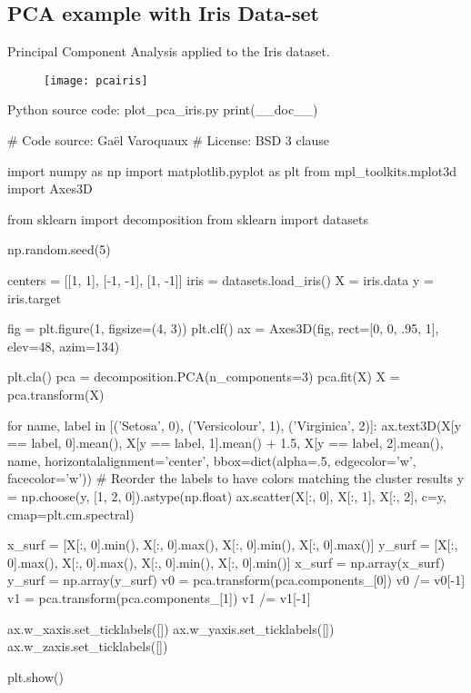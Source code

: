 \subsection*{PCA example with Iris Data-set}
Principal Component Analysis applied to the Iris dataset.
\begin{figure}
\centering
\texttt{[image: pcairis]}
\caption{}
\label{fig:pcairis}
\end{figure}

Python source code: plot_pca_iris.py
print(__doc__)


# Code source: Gaël Varoquaux
# License: BSD 3 clause

import numpy as np
import matplotlib.pyplot as plt
from mpl_toolkits.mplot3d import Axes3D


from sklearn import decomposition
from sklearn import datasets

np.random.seed(5)

centers = [[1, 1], [-1, -1], [1, -1]]
iris = datasets.load_iris()
X = iris.data
y = iris.target

fig = plt.figure(1, figsize=(4, 3))
plt.clf()
ax = Axes3D(fig, rect=[0, 0, .95, 1], elev=48, azim=134)

plt.cla()
pca = decomposition.PCA(n_components=3)
pca.fit(X)
X = pca.transform(X)

for name, label in [('Setosa', 0), ('Versicolour', 1), ('Virginica', 2)]:
ax.text3D(X[y == label, 0].mean(),
X[y == label, 1].mean() + 1.5,
X[y == label, 2].mean(), name,
horizontalalignment='center',
bbox=dict(alpha=.5, edgecolor='w', facecolor='w'))
# Reorder the labels to have colors matching the cluster results
y = np.choose(y, [1, 2, 0]).astype(np.float)
ax.scatter(X[:, 0], X[:, 1], X[:, 2], c=y, cmap=plt.cm.spectral)

x_surf = [X[:, 0].min(), X[:, 0].max(),
X[:, 0].min(), X[:, 0].max()]
y_surf = [X[:, 0].max(), X[:, 0].max(),
X[:, 0].min(), X[:, 0].min()]
x_surf = np.array(x_surf)
y_surf = np.array(y_surf)
v0 = pca.transform(pca.components_[0])
v0 /= v0[-1]
v1 = pca.transform(pca.components_[1])
v1 /= v1[-1]

ax.w_xaxis.set_ticklabels([])
ax.w_yaxis.set_ticklabels([])
ax.w_zaxis.set_ticklabels([])

plt.show()

